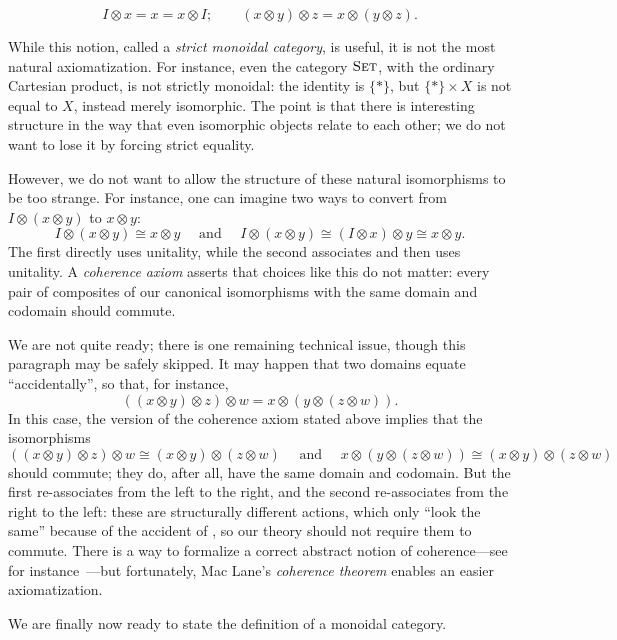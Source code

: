 \[
  I\otimes x = x = x\otimes I; \quad\quad (x\otimes y)\otimes z =
  x\otimes(y\otimes z).
\]

While this notion, called a \emph{strict monoidal category}, is useful, it is
not the most natural axiomatization. For instance, even the category
${\textsc{\text{Set}}}$, with the ordinary Cartesian product, is not strictly monoidal: the
identity is $\{*\}$, but $\{*\}\times X$ is not equal to $X$, instead merely
isomorphic. The point is that there is interesting structure in the way that
even isomorphic objects relate to each other; we do not want to lose it by
forcing strict equality.

However, we do not want to allow the structure of these natural isomorphisms to
be too strange. For instance, one can imagine two ways to convert from $I\otimes (x\otimes y)$
to $x\otimes y$: \[
  I\otimes(x\otimes y) \cong x\otimes y \quad\text{ and }\quad
  I\otimes(x\otimes y) \cong (I\otimes x)\otimes y \cong x\otimes y.
\]The first directly uses unitality, while the second associates and then uses
unitality. A \emph{coherence axiom} asserts that choices like this do not
matter: every pair of composites of our canonical isomorphisms with the same
domain and codomain should commute.

We are not quite ready; there is one remaining technical issue, though this
paragraph may be safely skipped. It may happen that two
domains equate ``accidentally'', so that, for instance,
\begin{equation}\label{eqn:accidental equality}
  ((x\otimes y)\otimes z)\otimes w = x\otimes(y\otimes(z\otimes w)).
\end{equation}
In this case, the version of the coherence axiom stated above implies that the
isomorphisms \[
  ((x\otimes y)\otimes z)\otimes w \cong (x\otimes y)\otimes (z\otimes w)
  \quad\text{ and }\quad
  x\otimes(y\otimes(z\otimes w)) \cong (x\otimes y)\otimes (z\otimes w)
\] should commute; they do, after all, have the same domain and codomain. But
the first re-associates from the left to the right, and the second re-associates
from the right to the left: these are structurally different actions, which only
``look the same'' because of the accident of ,
so our theory should not require them to commute. There is a way to formalize
a correct abstract notion of coherence---see for instance~\cite[subsection
VII.2]{maclane-1971}---but fortunately, Mac Lane's \emph{coherence theorem}
enables an easier axiomatization.

We are finally now ready to state the definition of a monoidal category.

